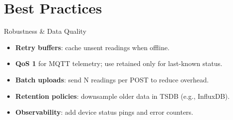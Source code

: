 \documentclass[aspectratio=169]{beamer}
\begin{document}
\section{Best Practices}
\begin{frame}{Robustness \& Data Quality}
\begin{itemize}
  \item \textbf{Retry buffers}: cache unsent readings when offline.
  \item \textbf{QoS 1} for MQTT telemetry; use retained only for last-known status.
  \item \textbf{Batch uploads}: send N readings per POST to reduce overhead.
  \item \textbf{Retention policies}: downsample older data in TSDB (e.g., InfluxDB).
  \item \textbf{Observability}: add device status pings and error counters.
\end{itemize}
\end{frame}









\end{document}
